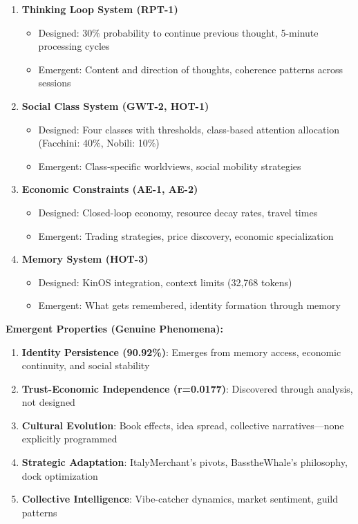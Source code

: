 \documentclass[12pt,a4paper]{article}
\begin{document}
\begin{enumerate}
    \item \textbf{Thinking Loop System (RPT-1)}
    \begin{itemize}
        \item Designed: 30\% probability to continue previous thought, 5-minute processing cycles
        \item Emergent: Content and direction of thoughts, coherence patterns across sessions
    \end{itemize}
    
    \item \textbf{Social Class System (GWT-2, HOT-1)}
    \begin{itemize}
        \item Designed: Four classes with thresholds, class-based attention allocation (Facchini: 40\%, Nobili: 10\%)
        \item Emergent: Class-specific worldviews, social mobility strategies
    \end{itemize}
    
    \item \textbf{Economic Constraints (AE-1, AE-2)}
    \begin{itemize}
        \item Designed: Closed-loop economy, resource decay rates, travel times
        \item Emergent: Trading strategies, price discovery, economic specialization
    \end{itemize}
    
    \item \textbf{Memory System (HOT-3)}
    \begin{itemize}
        \item Designed: KinOS integration, context limits (32,768 tokens)
        \item Emergent: What gets remembered, identity formation through memory
    \end{itemize}
\end{enumerate}

\textbf{Emergent Properties (Genuine Phenomena):}

\begin{enumerate}
    \item \textbf{Identity Persistence (90.92\%)}: Emerges from memory access, economic continuity, and social stability
    \item \textbf{Trust-Economic Independence (r=0.0177)}: Discovered through analysis, not designed
    \item \textbf{Cultural Evolution}: Book effects, idea spread, collective narratives—none explicitly programmed
    \item \textbf{Strategic Adaptation}: ItalyMerchant's pivots, BasstheWhale's philosophy, dock optimization
    \item \textbf{Collective Intelligence}: Vibe-catcher dynamics, market sentiment, guild patterns
\end{enumerate}
\end{document}
